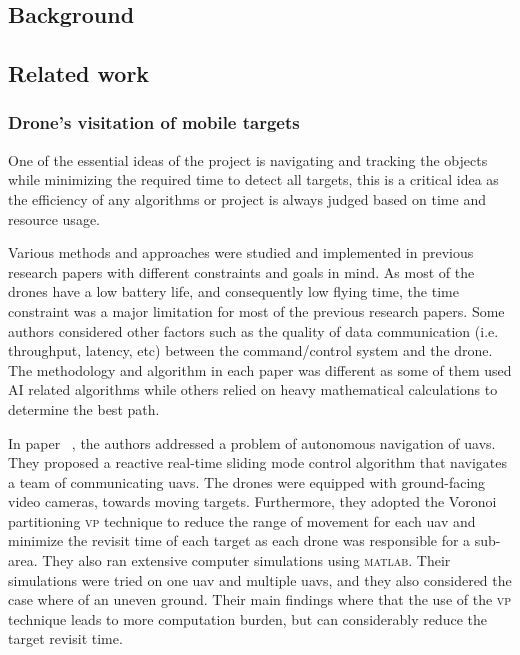 \documentclass[../main.tex]{subfiles}
\begin{document}
\subsection{Background}

\blindtext

\subsection{Related work}

	\subsubsection{Drone's visitation of mobile targets}

		One of the essential ideas of the project is navigating and tracking the objects while minimizing the required time to detect all targets, this is a critical idea as the efficiency of any algorithms or project is always judged based on time and resource usage.
		
		Various methods and approaches were studied and implemented in previous research papers with different constraints and goals in mind.
		As most of the drones have a low battery life, and consequently low flying time, the time constraint was a major limitation for most of the previous research papers. 
		Some authors considered other factors such as the quality of data communication (i.e. throughput, latency, etc) between the command/control system and the drone.
		The methodology and algorithm in each paper was different as some of them used AI related algorithms while others relied on heavy mathematical calculations to determine the best path.
		
		In paper ~\cite{hua20}, the authors \citeauthor{hua20} addressed a problem of autonomous navigation of \glspl{uav}. 
		They proposed a reactive real-time sliding mode control algorithm that navigates a team of communicating \glspl{uav}.
		The drones were equipped with ground-facing video cameras, towards moving targets. 
		Furthermore, they adopted the Voronoi partitioning \textsc{vp} technique to reduce the range of movement for each \gls{uav} and minimize the revisit time of each target as each drone was responsible for a sub-area.
		They also ran extensive computer simulations using \textsc{matlab}. Their simulations were tried on one \gls{uav} and multiple \glspl{uav},
		and they also considered the case where of an uneven ground. 
		Their main findings where that the use of the \textsc{vp} technique leads to more computation burden, but can considerably reduce the target revisit time.
		
\end{document}
